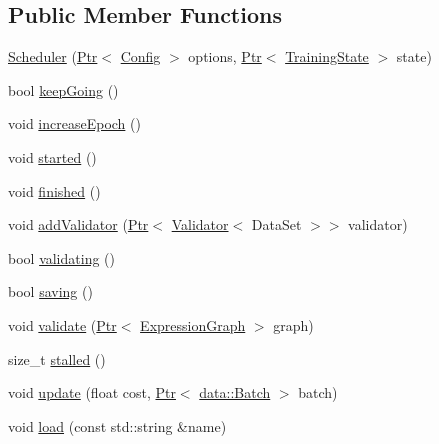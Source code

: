 \subsection*{Public Member Functions}
\begin{DoxyCompactItemize}
\item 
\hyperlink{classmarian_1_1Scheduler_a359fad66eecaa3154e59376cad3678dd}{Scheduler} (\hyperlink{namespacemarian_ad1a373be43a00ef9ce35666145137b08}{Ptr}$<$ \hyperlink{classmarian_1_1Config}{Config} $>$ options, \hyperlink{namespacemarian_ad1a373be43a00ef9ce35666145137b08}{Ptr}$<$ \hyperlink{classmarian_1_1TrainingState}{Training\+State} $>$ state)
\item 
bool \hyperlink{classmarian_1_1Scheduler_a2e95b34dd1986da820bde25d789a4731}{keep\+Going} ()
\item 
void \hyperlink{classmarian_1_1Scheduler_a0ee8d27640f833b0affbd97c533f5c41}{increase\+Epoch} ()
\item 
void \hyperlink{classmarian_1_1Scheduler_af07b9207caf41976becdd83b6db0ba1b}{started} ()
\item 
void \hyperlink{classmarian_1_1Scheduler_a8413088ceeec0a34377ab494040bc63d}{finished} ()
\item 
void \hyperlink{classmarian_1_1Scheduler_a7be0ff053576c291ee6ae67f643b99b6}{add\+Validator} (\hyperlink{namespacemarian_ad1a373be43a00ef9ce35666145137b08}{Ptr}$<$ \hyperlink{classmarian_1_1Validator}{Validator}$<$ Data\+Set $>$$>$ validator)
\item 
bool \hyperlink{classmarian_1_1Scheduler_afcc419dc5a3e63ea527a5736cd74c20a}{validating} ()
\item 
bool \hyperlink{classmarian_1_1Scheduler_aca8964e80c6841115d315eb32c8bc82f}{saving} ()
\item 
void \hyperlink{classmarian_1_1Scheduler_abbd43aacb8b92dd94ffb0f5a104f6c59}{validate} (\hyperlink{namespacemarian_ad1a373be43a00ef9ce35666145137b08}{Ptr}$<$ \hyperlink{classmarian_1_1ExpressionGraph}{Expression\+Graph} $>$ graph)
\item 
size\+\_\+t \hyperlink{classmarian_1_1Scheduler_a4cf4975987ba59c33d01d4d29d2f3dbd}{stalled} ()
\item 
void \hyperlink{classmarian_1_1Scheduler_a597f3c74e486631a95ea94d892e80c4c}{update} (float cost, \hyperlink{namespacemarian_ad1a373be43a00ef9ce35666145137b08}{Ptr}$<$ \hyperlink{classmarian_1_1data_1_1Batch}{data\+::\+Batch} $>$ batch)
\item 
void \hyperlink{classmarian_1_1Scheduler_a3ff42a5102d69aa8858c0dad4aebfa65}{load} (const std\+::string \&name)
$$
\end{DoxyCompactItemize}
